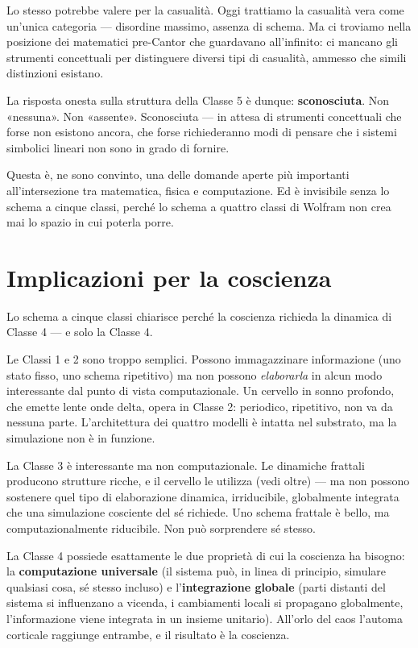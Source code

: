 \documentclass[11pt, twoside, openright]{book}
\begin{document}
Lo stesso potrebbe valere per la casualità. Oggi trattiamo la casualità vera come un'unica categoria --- disordine massimo, assenza di schema. Ma ci troviamo nella posizione dei matematici pre-Cantor che guardavano all'infinito: ci mancano gli strumenti concettuali per distinguere diversi tipi di casualità, ammesso che simili distinzioni esistano.

La risposta onesta sulla struttura della Classe 5 è dunque: \textbf{sconosciuta}. Non «nessuna». Non «assente». Sconosciuta --- in attesa di strumenti concettuali che forse non esistono ancora, che forse richiederanno modi di pensare che i sistemi simbolici lineari non sono in grado di fornire.

Questa è, ne sono convinto, una delle domande aperte più importanti all'intersezione tra matematica, fisica e computazione. Ed è invisibile senza lo schema a cinque classi, perché lo schema a quattro classi di Wolfram non crea mai lo spazio in cui poterla porre.

\section*{Implicazioni per la coscienza}

Lo schema a cinque classi chiarisce perché la coscienza richieda la dinamica di Classe 4 --- e solo la Classe 4.

Le Classi 1 e 2 sono troppo semplici. Possono immagazzinare informazione (uno stato fisso, uno schema ripetitivo) ma non possono \textit{elaborarla} in alcun modo interessante dal punto di vista computazionale. Un cervello in sonno profondo, che emette lente onde delta, opera in Classe 2: periodico, ripetitivo, non va da nessuna parte. L'architettura dei quattro modelli è intatta nel substrato, ma la simulazione non è in funzione.

La Classe 3 è interessante ma non computazionale. Le dinamiche frattali producono strutture ricche, e il cervello le utilizza (vedi oltre) --- ma non possono sostenere quel tipo di elaborazione dinamica, irriducibile, globalmente integrata che una simulazione cosciente del sé richiede. Uno schema frattale è bello, ma computazionalmente riducibile. Non può sorprendere sé stesso.

La Classe 4 possiede esattamente le due proprietà di cui la coscienza ha bisogno: la \textbf{computazione universale} (il sistema può, in linea di principio, simulare qualsiasi cosa, sé stesso incluso) e l'\textbf{integrazione globale} (parti distanti del sistema si influenzano a vicenda, i cambiamenti locali si propagano globalmente, l'informazione viene integrata in un insieme unitario). All'orlo del caos l'automa corticale raggiunge entrambe, e il risultato è la coscienza.
\end{document}
